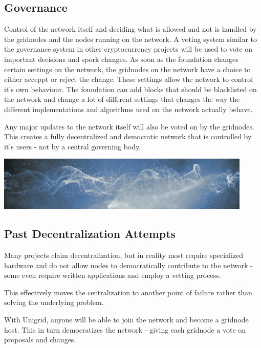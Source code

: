 \documentclass{article}
\begin{document}
\subsection{Governance}
Control of the network itself and deciding what is allowed and not is handled by the gridnodes and the nodes running on the network. A voting system similar to the governance system in other cryptocurrency projects will be used to vote on important decisions and spork changes. As soon as the foundation changes certain settings on the network, the gridnodes on the network have a choice to either acceppt or reject the change. These settings allow the network to control it's own behaviour. The foundation can add blocks that should be blacklisted on the network and change a lot of different settings that changes the way the different implementations and algorithms used on the network actually behave.

Any major updates to the network itself will also be voted on by the gridnodes. This creates a fully decentralized and democratic network that is controlled 
by it's users - not by a central governing body.

\begin{mdframed}[style=textimage]
	\includegraphics[width=345pt]{abstract-particles}
\end{mdframed}

\subsection{Past Decentralization Attempts}
Many projects claim decentralization, but in reality most require specialized hardware and do not allow nodes to democratically contribute to the network - some even require written applications and employ a vetting process.

\noindent This effectively moves the centralization to another point of failure rather than solving the underlying problem.

With Unigrid, anyone will be able to join the network and become a gridnode host. This in turn democratizes the network - giving each gridnode a vote on proposals and changes.
\end{document}
